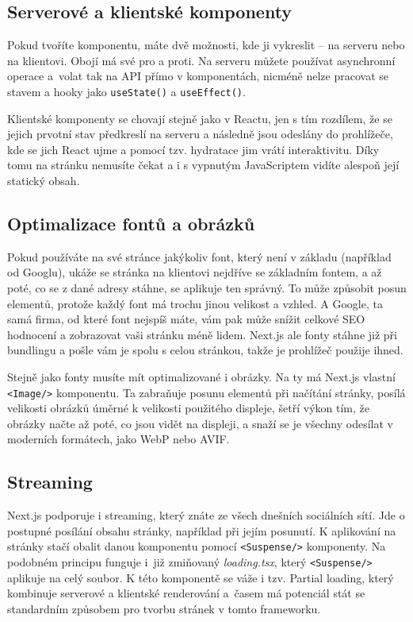 \subsection*{Serverové a klientské komponenty}

Pokud tvoříte komponentu, máte dvě možnosti, kde ji vykreslit\cite{NextJSS&CComponents} – na serveru\cite{NextJSServerComponents} nebo na klientovi\cite{NextJSClientComponents}. Obojí má své pro a proti. Na serveru můžete používat asynchronní operace a~volat tak na API přímo v komponentách, nicméně nelze pracovat se stavem a hooky jako \texttt{useState()} a \texttt{useEffect()}.

Klientské komponenty se chovají stejně jako v Reactu, jen s tím rozdílem, že se jejich prvotní stav předkreslí na serveru a následně jsou odeslány do prohlížeče, kde se jich React ujme a pomocí tzv. hydratace jim vrátí interaktivitu. Díky tomu na stránku nemusíte čekat a i s vypnutým JavaScriptem vidíte alespoň její statický obsah.\cite{NextHydration}

\subsection*{Optimalizace fontů a obrázků}

Pokud používáte na své stránce jakýkoliv font, který není v základu (například od Googlu), ukáže se stránka na klientovi nejdříve se základním fontem, a až poté, co se z dané adresy stáhne, se aplikuje ten správný. To může způsobit posun elementů, protože každý font má trochu jinou velikost a vzhled. A Google, ta samá firma, od které font nejspíš máte, vám pak může snížit celkové SEO hodnocení a zobrazovat vaši stránku méně lidem. Next.js ale fonty stáhne již při bundlingu a pošle vám je spolu s celou stránkou, takže je prohlížeč použije ihned.

Stejně jako fonty musíte mít optimalizované i obrázky. Na ty má Next.js vlastní \texttt{<Image/>} komponentu. Ta zabraňuje posunu elementů při načítání stránky, posílá velikosti obrázků úměrné k velikosti použitého displeje, šetří výkon tím, že obrázky načte až poté, co jsou vidět na displeji, a snaží se je všechny odesílat v moderních formátech, jako WebP nebo AVIF.

\subsection*{Streaming}

Next.js podporuje i streaming, který znáte ze všech dnešních sociálních sítí. Jde o postupné posílání obsahu stránky, například při jejím posunutí. K aplikování na stránky stačí obalit danou komponentu pomocí \texttt{<Suspense/>} komponenty. Na podobném principu funguje i~již zmiňovaný \textit{loading.tsx}, který \texttt{<Suspense/>} aplikuje na celý soubor. K této komponentě se váže i tzv. Partial loading, který kombinuje serverové a klientské renderování a~časem má potenciál stát se standardním způsobem pro tvorbu stránek v tomto frameworku.

